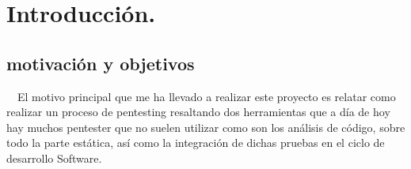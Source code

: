 \chapter{Introducción.}
\section{motivación y objetivos}

  El motivo principal que me ha llevado a realizar este proyecto es relatar como realizar un proceso 
de pentesting resaltando dos herramientas que a día de hoy hay muchos pentester que no suelen utilizar
como son los análisis de código, sobre todo la parte estática, así como la integración de dichas 
pruebas en el ciclo de desarrollo Software.

\clearpage